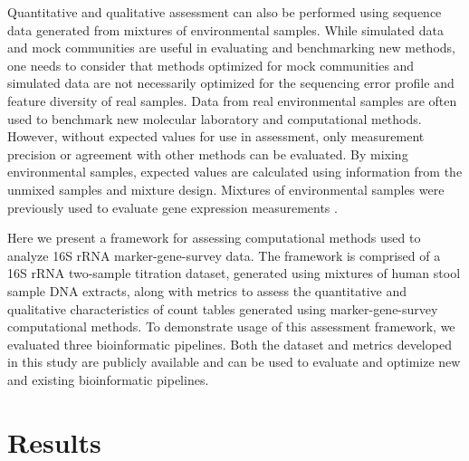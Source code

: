 \documentclass{bmcart}
\begin{document}
Quantitative and qualitative assessment can also be performed using
sequence data generated from mixtures of environmental samples. While
simulated data and mock communities are useful in evaluating and
benchmarking new methods, one needs to consider that methods optimized
for mock communities and simulated data are not necessarily optimized
for the sequencing error profile and feature diversity of real samples.
Data from real environmental samples are often used
to benchmark new molecular laboratory and computational methods.
However, without expected values for use in assessment, only measurement
precision or agreement with other methods can be evaluated. By mixing
environmental samples, expected values are calculated using information
from the unmixed samples and mixture design. Mixtures of environmental
samples were previously used to evaluate gene expression measurements
\cite{parsons2015using, pine2011adaptable, thompson2005use}.


Here we present a framework for assessing computational methods used to
analyze 16S rRNA marker-gene-survey data. The framework is comprised of a 16S rRNA
two-sample titration dataset,  generated using mixtures of human stool sample DNA extracts, along with metrics to assess the quantitative and qualitative characteristics of count tables generated using marker-gene-survey computational methods.
To demonstrate usage of this assessment framework, we evaluated three bioinformatic pipelines.
Both the dataset and metrics developed in this study are publicly available and can be used to evaluate and optimize
new and existing bioinformatic pipelines.


\section*{Results}
\end{document}
